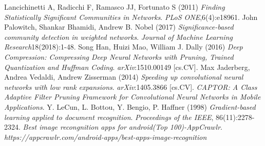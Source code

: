 \documentclass{acmtog} %
\begin{document}
\begin{table*}[htbp]
\label{tab:LeNet-300-100}
\end{table*}

\begin{table*}[htbp]
\label{tab:LeNet-5}
\end{table*}



\begin{thebibliography}{00}

Lancichinetti A, Radicchi F, Ramasco JJ, Fortunato S (2011) \emph{Finding Statistically Significant Communities in Networks}. \emph{PLoS ONE},6(4):e18961.
John Palowitch, Shankar Bhamidi, Andrew B. Nobel (2017) \emph{Significance-based community detection in weighted networks}. \emph{Journal of Machine Learning Research}18(2018):1-48.
Song Han, Huizi Mao, William J. Dally (2016) \emph{Deep Compression: Compressing Deep Neural Networks with Pruning, Trained Quantization and Huffman Coding}. \emph{arXiv}:1510.00149 [cs.CV].
Max Jaderberg, Andrea Vedaldi, Andrew Zisserman (2014) \emph{Speeding up convolutional neural networks with low rank expansions}. \emph{arXiv}:1405.3866 [cs.CV].
\emph{CAPTOR: A Class Adaptive Filter Pruning Framework for Convolutional Neural Networks in Mobile Applications}.
Y. LeCun, L. Bottou, Y. Bengio, P. Haffner (1998) \emph{Gradient-based learning applied to document recognition}. \emph{Proceedings of the IEEE}, 86(11):2278-2324.
\emph{Best image recongnition apps for android(Top 100)-AppCrawlr}. \emph{https://appcrawlr.com/android-apps/best-apps-image-recognition}
\end{thebibliography}
\end{document}
